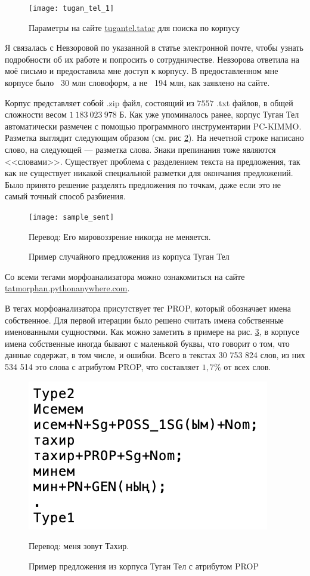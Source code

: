 \begin{figure}
\caption{Параметры на сайте \href{http://tugantel.tatar/}{tugantel.tatar} для поиска по корпусу}
\texttt{[image: tugan\_tel\_1]}
\label{fig:tugan_tel_1}
\end{figure}


Я связалась с Невзоровой по указанной в статье электронной почте, чтобы узнать подробности об их работе и попросить о сотрудничестве. Невзорова ответила на моё письмо и предоставила мне доступ к корпусу. В предоставленном мне корпусе было ~30 млн словоформ, а не ~194 млн, как заявлено на сайте. 

Корпус представляет собой .zip файл, состоящий из $7557$ .txt файлов, в общей сложности весом $1\ 183\ 023\ 978$ Б. Как уже упоминалось ранее, корпус Туган Тел автоматически размечен с помощью программного инструментарии PC-KIMMO. Разметка выглядит следующим образом (см. рис \ref{fig:sample_sent}). На нечетной строке написано слово, на следующей --- разметка слова. Знаки препинания тоже являются <<словами>>. Существует проблема с разделением текста на предложения, так как не существует никакой специальной разметки для окончания предложений. Было принято решение разделять предложения по точкам, даже если это не самый точный способ разбиения.

\begin{figure}
\caption{Пример случайного предложения из корпуса Туган Тел}
\texttt{[image: sample\_sent]}
\label{fig:sample_sent}

Перевод: Его мировоззрение никогда не меняется.
\end{figure}

Со всеми тегами морфоанализатора можно ознакомиться на сайте \href{http://tatmorphan.pythonanywhere.com/morphan_tags}{tatmorphan.pythonanywhere.com}.

В тегах морфоанализатора присутствует тег PROP, который обозначает имена собственное. Для первой итерации было решено считать имена собственные именованными сущностями. Как можно заметить в примере на рис. \ref{fig:prop_sent}, в корпусе имена собственные иногда бывают с маленькой буквы, что говорит о том, что данные содержат, в том числе, и ошибки.
Всего в текстах 30 753 824 слов, из них 534 514 это слова с атрибутом PROP, что составляет $1,7\%$ от всех слов. 

\begin{figure}
\caption{Пример предложения из корпуса Туган Тел с атрибутом PROP}
\includegraphics{pics/prop_sent}
\label{fig:prop_sent}

Перевод: меня зовут Тахир.
\end{figure}

